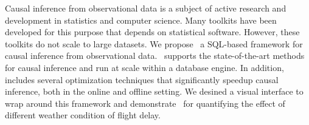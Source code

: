 Causal inference from observational data is a subject of active research and development in statistics and computer science. Many toolkits have been developed for this purpose that
 depends on  statistical software. However, these toolkits do not scale to large datasets. We propose \GSQL \ a SQL-based framework  for causal inference from observational data.  \GSQL \ supports the state-of-the-art methods for causal inference and run at scale
  within a database engine. In addition, \GSQL includes
  several optimization techniques that significantly speedup causal
  inference, both in the online and offline setting.  We desined a visual interface to wrap around this framework 
  and demonstrate \GSQL\  for quantifying the effect of different weather condition of flight delay. 